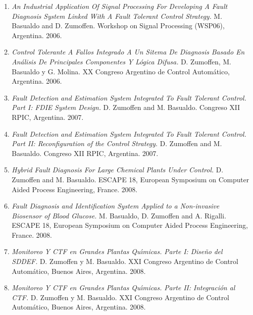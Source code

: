 \begin{enumerate}
\item \textit{An Industrial Application Of Signal Processing For Developing A Fault Diagnosis System Linked With A Fault Tolerant Control Strategy.}
M. Basualdo and D. Zumoffen. Workshop on Signal Processing (WSP06), Argentina. 2006.

\item \textit{Control Tolerante A Fallos Integrado A Un Sitema De Diagnosis Basado En An{\'a}lisis De Principales Componentes Y L{\'o}gica Difusa.} D.
Zumoffen, M. Basualdo y G. Molina. XX  Congreso Argentino de Control Autom{\'a}tico, Argentina. 2006.

\item \textit{Fault Detection and Estimation System Integrated To Fault Tolerant Control. Part I: FDIE System Design.} D. Zumoffen and M. Basualdo.
Congreso XII RPIC, Argentina. 2007.

\item \textit{Fault Detection and Estimation System Integrated To Fault Tolerant Control. Part II: Reconfiguration of the Control Strategy.} D.
Zumoffen and M. Basualdo. Congreso XII RPIC, Argentina. 2007.

\item \textit{Hybrid Fault Diagnosis For Large Chemical Plants Under Control.} D. Zumoffen and M. Basualdo. ESCAPE 18, European Symposium on Computer
Aided Process Engineering, France. 2008.

\item \textit{Fault Diagnosis and Identification System Applied to a Non-invasive Biosensor of Blood Glucose.} M. Basualdo, D. Zumoffen and A.
Rigalli. ESCAPE 18, European Symposium on Computer Aided Process Engineering, France. 2008.

\item \textit{Monitoreo Y CTF en Grandes Plantas Qu{\'\i}micas. Parte I: Dise{\~n}o del SDDEF.} D. Zumoffen y M. Basualdo. XXI Congreso Argentino de Control
Autom{\'a}tico, Buenos Aires, Argentina. 2008.

\item \textit{Monitoreo Y CTF en Grandes Plantas Qu{\'\i}micas. Parte II: Integraci{\'o}n al CTF.} D. Zumoffen y M. Basualdo. XXI Congreso Argentino de
Control Autom{\'a}tico, Buenos Aires, Argentina. 2008.
\end{enumerate}
\normalsize
